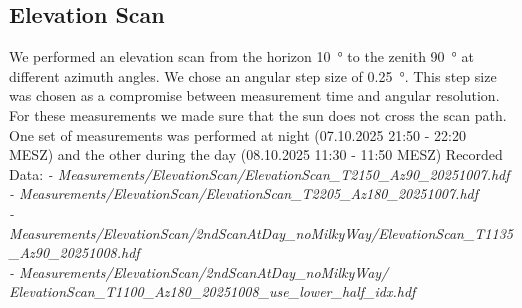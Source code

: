 \subsection{Elevation Scan}
We performed an elevation scan from the horizon \SI{10}{\degree} to the zenith \SI{90}{\degree} at different  azimuth angles.
We chose an angular step size of \SI{0.25}{\degree}. This step size was chosen as a compromise between measurement time and angular resolution.
For these measurements we made sure that the sun does not cross the scan path.
One set of measurements was performed at night (07.10.2025 21:50 - 22:20 MESZ) and the other during the day (08.10.2025 11:30 - 11:50 MESZ)
Recorded Data:
\textit{
- Measurements/ElevationScan/ElevationScan\_T2150\_Az90\_20251007.hdf\\
- Measurements/ElevationScan/ElevationScan\_T2205\_Az180\_20251007.hdf\\
- Measurements/ElevationScan/2ndScanAtDay\_noMilkyWay/ElevationScan\_T1135\_Az90\_20251008.hdf\\
- Measurements/ElevationScan/2ndScanAtDay\_noMilkyWay/\\
\phantom{- Measurements/}ElevationScan\_T1100\_Az180\_20251008\_use\_lower\_half\_idx.hdf\\
}
